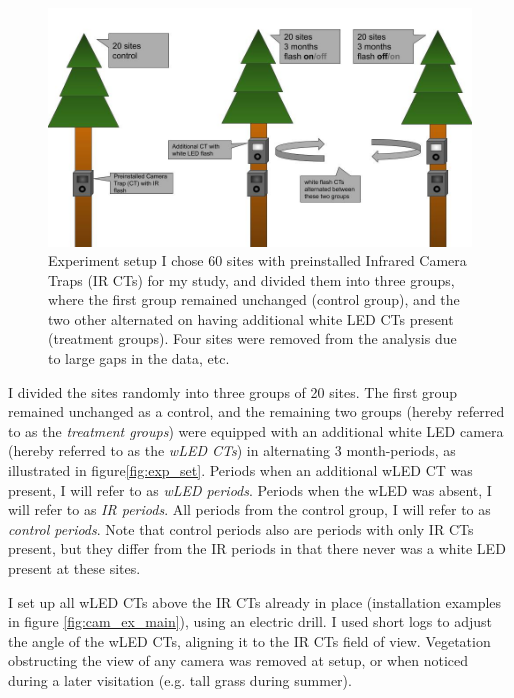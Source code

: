 \begin{figure}
    \begin{center}
    	\includegraphics[scale=0.4]{./img/experiment_setup.jpg} %
    \end{center}
\caption[Experiment setup]
    	{Experiment setup %
    	 I chose 60 sites with preinstalled Infrared Camera Traps (IR CTs) for my study, and divided them into three groups, where the first group remained unchanged (control group), and the two other alternated on having additional white LED CTs present (treatment groups). Four sites were removed from the analysis due to large gaps in the data, etc.}
    \label{fig:exp_set}
\end{figure} 


I divided the sites randomly into three groups of 20 sites.
The first group remained unchanged as a control, and the remaining two groups (hereby referred to as the \emph{treatment groups}) were equipped with an additional white LED camera (hereby referred to as the \emph{wLED CTs}) in alternating 3 month-periods, as illustrated in figure\vref{fig:exp_set}.
Periods when an additional wLED CT was present, I will refer to as \emph{wLED periods}.
Periods when the wLED was absent, I will refer to as \emph{IR periods}.
All periods from the control group, I will refer to as \emph{control periods}.
Note that control periods also are periods with only IR CTs present, but they differ from the IR periods in that there never was a white LED present at these sites.


I set up all wLED CTs above the IR CTs already in place (installation examples in figure \ref{fig:cam_ex_main}), using an electric drill. 
I used short logs to adjust the angle of the wLED CTs, aligning it to the IR CTs field of view.
Vegetation obstructing the view of any camera was removed at setup, or when noticed during a later visitation (e.g. tall grass during summer).

